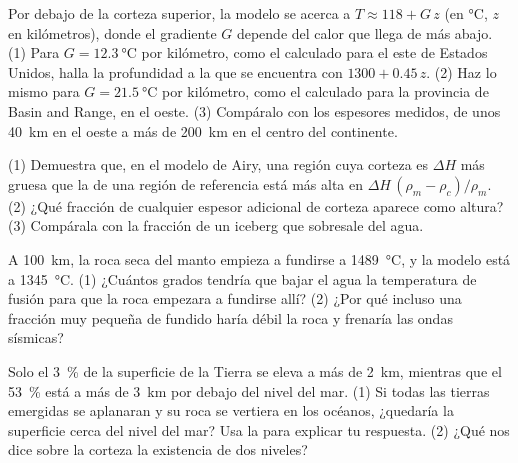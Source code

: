 \begin{exercise}[$\star\star\star$]\label{exo:g11:lithosphere-asthenosphere:12}
Por debajo de la corteza superior, la  modelo se acerca a $T \approx 118 +
G\,z$ (en \unit{\celsius}, $z$ en kilómetros), donde el gradiente $G$
depende del calor que llega de más abajo. (1) Para $G =
\qty{12.3}{\celsius}$ por kilómetro, como el calculado para el este de
Estados Unidos, halla la profundidad a la que se encuentra con $1300 + 0.45\,z$.
(2) Haz lo mismo para $G = \qty{21.5}{\celsius}$ por kilómetro, como el
calculado para la provincia de Basin and Range, en el oeste. (3) Compáralo con
los espesores medidos, de unos
\qty{40}{km} en el oeste a más de \qty{200}{km} en el centro del
continente.
\end{exercise}

\begin{exercise}[$\star\star\star$]\label{exo:g11:lithosphere-asthenosphere:13}
(1) Demuestra que, en el modelo de Airy, una región cuya corteza es $\Delta H$
más gruesa que la de una región de referencia está más alta en
$\Delta H\,(\rho_m - \rho_c)/\rho_m$. (2) ¿Qué fracción de cualquier espesor
adicional de corteza aparece como altura? (3) Compárala con la fracción de un
iceberg que sobresale del agua.
\end{exercise}

\begin{exercise}[$\star\star\star$]\label{exo:g11:lithosphere-asthenosphere:14}
A \qty{100}{km}, la roca seca del manto empieza a fundirse a
\qty{1489}{\celsius}, y la  modelo está a \qty{1345}{\celsius}. (1)
¿Cuántos grados tendría que bajar el agua la temperatura de fusión para que
la roca empezara a fundirse allí? (2) ¿Por qué incluso una fracción muy pequeña
de fundido haría débil la roca y frenaría las ondas sísmicas?
\end{exercise}

\begin{exercise}[$\star\star\star$]\label{exo:g11:lithosphere-asthenosphere:15}
Solo el \qty{3}{\percent} de la superficie de la Tierra se eleva a más de
\qty{2}{km}, mientras que el \qty{53}{\percent} está a más de \qty{3}{km} por
debajo del nivel del mar. (1) Si todas las tierras emergidas se aplanaran y su
roca se vertiera en los océanos, ¿quedaría la superficie cerca del nivel del
mar? Usa la  para explicar tu respuesta. (2) ¿Qué nos dice sobre la
corteza la existencia de dos niveles?
\end{exercise}

